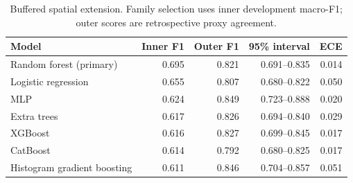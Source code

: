 \begin{table}[tbp]\centering\small
\caption{Buffered spatial extension. Family selection uses inner development macro-F1; outer scores are retrospective proxy agreement.}\label{tab:models}
\begin{tabular}{p{.35\linewidth}rrrr}\toprule
Model & Inner F1 & Outer F1 & 95\% interval & ECE \\\midrule
Random forest (primary) & 0.695 & 0.821 & 0.691--0.835 & 0.014 \\
Logistic regression & 0.655 & 0.807 & 0.680--0.822 & 0.050 \\
MLP & 0.624 & 0.849 & 0.723--0.888 & 0.020 \\
Extra trees & 0.617 & 0.826 & 0.694--0.840 & 0.029 \\
XGBoost & 0.616 & 0.827 & 0.699--0.845 & 0.017 \\
CatBoost & 0.614 & 0.792 & 0.680--0.825 & 0.017 \\
Histogram gradient boosting & 0.611 & 0.846 & 0.704--0.857 & 0.051 \\
\bottomrule\end{tabular}
\end{table}